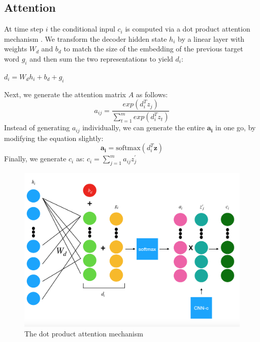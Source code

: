 \documentclass{article}
\begin{document}
\begin{flushleft}

\subsection{Attention}
At time step $i$ the conditional inpul $c_i$ is computed via a dot product attention mechanism \cite{luong2015effective}. We transform the decoder hidden state $h_i$ by a linear layer with weights $W_d$ and $b_d$ to match the size of the embedding of the previous target word $g_i$ and then sum the two representations to yield $d_i$:
\begin{center}
$d_i=W_dh_{i}+b_d+g_i$
\end{center}
Next, we generate the attention matrix $A$ as follows:
$$a_{ij} = \frac{exp \left(d_i^Tz_j\right)}{\sum^m_{t=1}exp\left(d_i^Tz_t\right)}$$
Instead of generating $a_{ij}$ individually, we can generate the entire $\mathbf{a_i}$ in one go, by modifying the equation slightly:
$$\mathbf{a_i} = \text{softmax}(d_i^T\mathbf{z})$$
Finally, we generate $c_i$ as:\linebreak
$c_i = \sum_{j=1}^{m}a_{ij}z^{\prime}_{j}$

\begin{figure}[h]
    \centering
	\captionsetup{justification=centering,margin=2cm}
    \includegraphics[scale=0.25]{Attention}
    \caption{The dot product attention mechanism}
    \label{fig:att}
\end{figure}


\end{flushleft}
\end{document}
